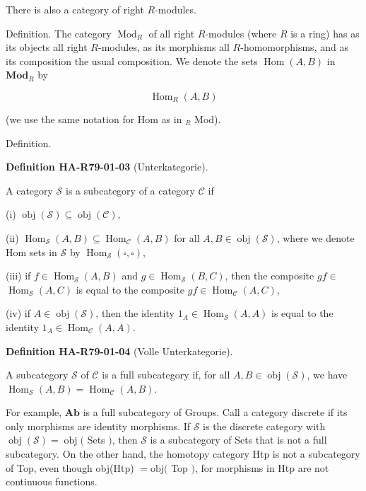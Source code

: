 \documentclass[10pt, letterpaper]{article}
\newcommand{\CustomHeading}[3]{%
  \par\medskip\noindent%
  \textbf{#1 #2} \textnormal{(#3)}.\enskip%
}
\newenvironment{DEF}[2]{\begin{unitbox}\CustomHeading{Definition}{#1}{#2}}{\end{unitbox}}
\begin{document}
There is also a category of right $R$-modules.

Definition. The category $\operatorname{Mod}_{R}$ of all right $R$-modules (where $R$ is a ring) has as its objects all right $R$-modules, as its morphisms all $R$-homomorphisms, and as its composition the usual composition. We denote the sets $\operatorname{Hom}(A, B)$ in $\mathbf{M o d}_{R}$ by

$$
\operatorname{Hom}_{R}(A, B)
$$

(we use the same notation for Hom as in ${ }_{R}$ Mod).




Definition. 


\begin{DEF}{HA-R79-01-03}{Unterkategorie}
A category $\mathcal{S}$ is a subcategory of a category $\mathcal{C}$ if

(i) $\operatorname{obj}(\mathcal{S}) \subseteq \operatorname{obj}(\mathcal{C})$,

(ii) $\operatorname{Hom}_{\mathcal{S}}(A, B) \subseteq \operatorname{Hom}_{\mathcal{C}}(A, B)$ for all $A, B \in \operatorname{obj}(\mathcal{S})$, where we denote Hom sets in $\mathcal{S}$ by $\operatorname{Hom}_{\mathcal{S}}(\square, \square)$,

(iii) if $f \in \operatorname{Hom}_{\mathcal{S}}(A, B)$ and $g \in \operatorname{Hom}_{\mathcal{S}}(B, C)$, then the composite $g f \in$ $\operatorname{Hom}_{\mathcal{S}}(A, C)$ is equal to the composite $g f \in \operatorname{Hom}_{\mathcal{C}}(A, C)$,

(iv) if $A \in \operatorname{obj}(\mathcal{S})$, then the identity $1_{A} \in \operatorname{Hom}_{\mathcal{S}}(A, A)$ is equal to the identity $1_{A} \in \operatorname{Hom}_{\mathcal{C}}(A, A)$.
\end{DEF}

\begin{DEF}{HA-R79-01-04}{Volle Unterkategorie}
A subcategory $\mathcal{S}$ of $\mathcal{C}$ is a full subcategory if, for all $A, B \in \operatorname{obj}(\mathcal{S})$, we have $\operatorname{Hom}_{\mathcal{S}}(A, B)=\operatorname{Hom}_{\mathcal{C}}(A, B)$.
\end{DEF}



For example, $\mathbf{A b}$ is a full subcategory of Groups. Call a category discrete if its only morphisms are identity morphisms. If $\mathcal{S}$ is the discrete category with $\operatorname{obj}(\mathcal{S})=\operatorname{obj}($ Sets $)$, then $\mathcal{S}$ is a subcategory of Sets that is not a full subcategory. On the other hand, the homotopy category Htp is not a subcategory of Top, even though obj(Htp) $=\mathrm{obj}($ Top $)$, for morphisms in Htp are not continuous functions.
\end{document}
